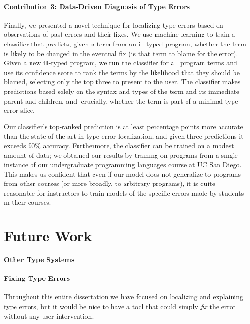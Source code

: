 \paragraph{Contribution 3: Data-Driven Diagnosis of Type Errors}
Finally, we presented a novel technique for localizing type errors based
on observations of past errors and their fixes.
%
We use machine learning to train a classifier that predicts, given a
term from an ill-typed program, whether the term is likely to be changed
in the eventual fix (\ie is that term to blame for the error).
%
Given a new ill-typed program, we run the classifier for all program
terms and use its confidence score to rank the terms by the likelihood
that they should be blamed, selecting only the top three to present to
the user.
%
The classifier makes predictions based solely on the syntax and types of
the term and its immediate parent and children, and, crucially, whether
the term is part of a minimal type error slice.

Our classifier's top-ranked prediction is at least \ToolnameWinSherrloc
percentage points more accurate than the state of the art in type error
localization, and given three predictions it exceeds 90\% accuracy.
%
Furthermore, the classifier can be trained on a modest amount of data;
we obtained our results by training on programs from a single instance
of our undergraduate programming languages course at UC San Diego.
%
This makes us confident that even if our model does not generalize to
programs from other courses (or more broadly, to arbitrary \ocaml
programs), it is quite reasonable for instructors to train models of the
specific errors made by students in their courses.


\section{Future Work}
\label{sec:conc:future-work}

\paragraph{Other Type Systems}

\paragraph{Fixing Type Errors}
Throughout this entire dissertation we have focused on localizing and
explaining type errors, but %
it would be nice to have a tool that
could simply \emph{fix} the error without any user intervention.



